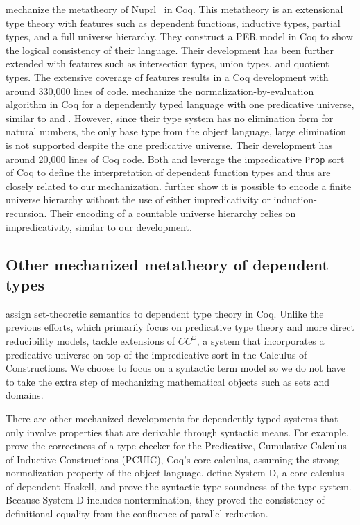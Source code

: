 \documentclass[\ifpublic nolinenum\else\fi,online,OA]{jfp}
\theoremstyle{definition}
\begin{document}
\citet{anand2014towards} mechanize the metatheory of
Nuprl~\citep{constable1986implementing} in Coq. This metatheory is an
extensional type theory with features such as dependent functions,
inductive types, partial types, and a full universe hierarchy. They construct a PER
model in Coq to show the logical consistency of their language. Their
development has been further extended with features such as
intersection types, union types, and quotient types. The extensive
coverage of features results in a Coq development with around
330,000 lines of code.
\citet{nbeincoq}
mechanize the normalization-by-evaluation algorithm in Coq for a
dependently typed language with one predicative universe, similar to
\citet{decagda} and \citet{martin-lof-a-la-coq}. However, since their
type system has no elimination form for natural numbers, the
only base type from the object language, large elimination is not
supported despite the one predicative universe. Their development has
around 20,000 lines of Coq code.
Both \citet{anand2014towards} and \citet{nbeincoq} leverage the
impredicative \texttt{Prop} sort of Coq to define the interpretation
of dependent function types and thus are closely related to our
mechanization. \citet{anand2014towards} further show it is possible
to encode a finite universe hierarchy without the use of
either impredicativity or induction-recursion. Their encoding of a countable
universe hierarchy relies on impredicativity, similar to our
development.

\subsection{Other mechanized metatheory of dependent types}

\citet{barras2010sets, Wang2013SemanticsOI} assign
set-theoretic semantics to dependent type theory in Coq. Unlike the
previous efforts, which primarily focus on predicative
type theory and more direct reducibility models,
\citet{barras2010sets, Wang2013SemanticsOI} tackle extensions of
$CC^\omega$, a system that incorporates a predicative universe on top
of the impredicative sort in the Calculus of Constructions. We choose to
focus on a syntactic term model so we do not have to take the extra step
of mechanizing mathematical objects such as sets and domains.

There are other mechanized developments for dependently typed systems that
only involve properties that are derivable through syntactic means. For
example, \citet{coqcoqcorrect2019} prove the correctness of a type checker
for the Predicative, Cumulative Calculus of Inductive Constructions (PCUIC),
Coq's core calculus, assuming the strong normalization property of the object
language. \citet{weirich:systemd} define System D, a core calculus of
dependent Haskell, and prove the syntactic type soundness of the type
system. Because System D includes nontermination, they proved
the consistency of definitional equality from the confluence of 
parallel reduction.  
\end{document}

